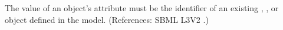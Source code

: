 The value of an \AssignmentRule object's  attribute must be
the identifier of an existing \Compartment, \Species, \Parameter or
\SpeciesReference object defined in the model.  (References: SBML L3V2
.)
